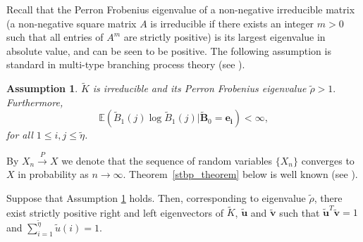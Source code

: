 \documentclass{article}
\newtheorem{assumption}{Assumption}
\theoremstyle{definition}
\newcommand{\lrp}[1]{\left({#1}\right)}
\newcommand{\Exp}[1]{\mathbb{E}\lrp{#1}}
\begin{document}
\noindent 
Recall that the Perron Frobenius eigenvalue of a non-negative irreducible matrix (a non-negative square matrix $A$ is irreducible if there exists an integer $m>0$ such that
all entries of $A^m$ are strictly positive) is its largest eigenvalue in absolute value, and can be seen to be positive. 
The following assumption is standard in multi-type branching process theory (see \cite{branching_process_notes}).
\begin{assumption} 
\label{Assumption_branching_standard}
     $\tilde{K}$ is  irreducible  and its Perron Frobenius eigenvalue $\tilde{\rho} >1.$   Furthermore, 
   \[
   \Exp{\tilde{B}_1(j)\log \tilde{B}_1(j)|\bm{\tilde{B}}_0=\bm{e_i}}<\infty,
   \]
    for all $ 1\leq i,j\leq \tilde{\eta}$. 
 
 \end{assumption}
 
  By $X_n \xrightarrow{P}X$ we denote  that the sequence of random variables $\{X_n\}$ converges to 
 $X$  in probability as $n \rightarrow \infty$.  Theorem~\ref{stbp_theorem} below   is well known (see \cite{branching_process_notes}).

 Suppose that Assumption \ref{Assumption_branching_standard} holds. Then, 
 corresponding to eigenvalue $\tilde{\rho}$, there exist  strictly positive right and left eigenvectors of $\tilde{K}$, $\bm{\tilde{u}}$ and $\bm{\tilde{v}}$   such that $\bm{\tilde{u}}^T\bm{\tilde{v}}=1$ and $\sum_{i=1}^{ \tilde{\eta}}{\tilde{u}(i)}  = 1$. 
 
\end{document}
